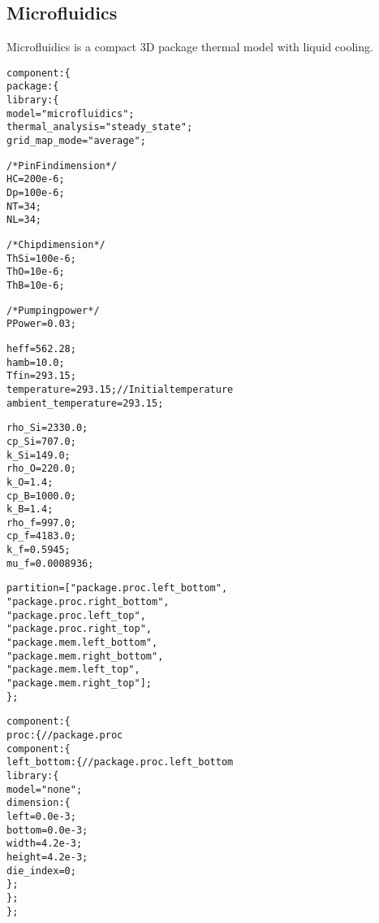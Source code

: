 \subsection{Microfluidics}
\noindent
Microfluidics is a compact 3D package thermal model with liquid cooling.
{
\fontsize{10pt}{11pt}\selectfont
\begin{alltt}
component: \{
    package: \{
        library: \{
            model = "microfluidics";
            thermal_analysis = "steady_state";
            grid_map_mode = "average";

            /* Pin Fin dimension */
            HC = 200e-6;
            Dp = 100e-6;
            NT = 34;
            NL = 34;

            /* Chip dimension */
            ThSi = 100e-6;
            ThO = 10e-6;
            ThB = 10e-6;

            /* Pumping power */
            PPower = 0.03;

            heff = 562.28;
            hamb = 10.0;
            Tfin = 293.15;
            temperature = 293.15; // Initial temperature
            ambient_temperature = 293.15;

            rho_Si = 2330.0;
            cp_Si = 707.0;
            k_Si = 149.0;
            rho_O = 220.0;
            k_O = 1.4;
            cp_B = 1000.0;
            k_B = 1.4;
            rho_f = 997.0;
            cp_f = 4183.0;
            k_f = 0.5945;
            mu_f = 0.0008936;
            
            partition = ["package.proc.left_bottom",
                         "package.proc.right_bottom",
                         "package.proc.left_top",
                         "package.proc.right_top",
                         "package.mem.left_bottom",
                         "package.mem.right_bottom",
                         "package.mem.left_top",
                         "package.mem.right_top"];
        \};

        component: \{
            proc: \{ // package.proc
                component: \{
                    left\_bottom: \{ // package.proc.left\_bottom
                        library: \{
                            model = "none";
                            dimension: \{
                                left = 0.0e-3;
                                bottom = 0.0e-3;
                                width = 4.2e-3;
                                height = 4.2e-3;
                                die_index = 0;
                            \};
                        \};
                    \};
                    

\end{alltt}}
